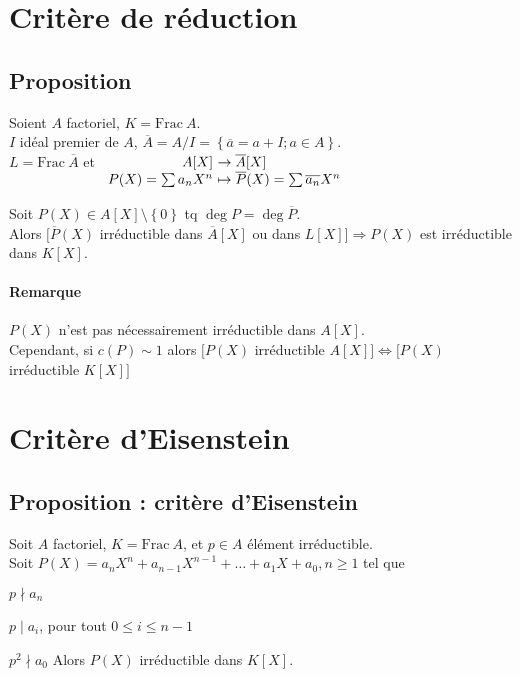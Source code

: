 \documentclass[reqno,a4paper,10pt]{report}
\makeatletter
\newcommand{\set}[1]{\left\lbrace #1 \right\rbrace} %
\newcommand{\Frac}{\mathrm{Frac}\:} %
\newcommand{\so}{\Rightarrow}
\let\oldenumerate=\enumerate%
\renewenvironment{enumerate}{%
    \oldenumerate%
  }{%
    \@noparlisttrue%
    \endlist%
  }%
\makeatother
\begin{document}
\section{Critère de réduction}
\subsection{Proposition}
Soient $A$ factoriel, $K=\Frac A$.\\
$I$ idéal premier de $A$, $\overline A = A/I = \set{\overline a = a+I;
a \in A}$.\\
$L=\Frac \overline A$ et $
\begin{array}[t]{r@{\ }l}
  A[X] &\to \overline A[X]\\
  P(X)=\sum a_n X^n &\mapsto \overline P (X) = \sum \overline{a_n} X^n
\end{array}
  $

Soit $P(X)\in A[X]\setminus\set{0}$ tq $\deg P=\deg \overline P$.\\
Alors $\Big[\overline P(X)$ irréductible dans $\overline A[X]$ ou dans
$L[X]\Big]\so P(X)$ est irréductible dans $K[X]$.

\begin{comment}
  Preuve 16/12/09 p1
\end{comment}

\paragraph{Remarque}
$P(X)$ n'est pas nécessairement irréductible dans $A[X]$.\\
Cependant, si $c(P)\sim 1$ alors $\Big[P(X)$ irréductible $A[X]\Big]
\iff \Big[P(X)$ irréductible $K[X]\Big]$

\section{Critère d'Eisenstein}
\subsection{Proposition : critère d'Eisenstein}
Soit $A$ factoriel, $K=\Frac A$, et $p \in A$ élément irréductible.\\
Soit $P(X)=a_n X^n + a_{n-1} X^{n-1}+\dots+a_1 X+a_0, n \geq 1$ tel que 
\begin{enumerate}[(i)]
  \item $p \nmid a_n$
  \item $p \mid a_i$, pour tout $0 \leq i \leq n-1$
  \item $p^2 \nmid a_0$
\end{enumerate}
Alors $P(X)$ irréductible dans $K[X]$.
\end{document}
